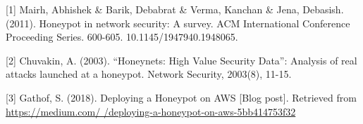 \documentclass{sig-alternate}
\begin{document}
%
%
%
[1] Mairh, Abhishek \& Barik, Debabrat \& Verma, Kanchan \& Jena, Debasish. (2011). Honeypot in network security: A survey. ACM International Conference Proceeding Series. 600-605. 10.1145/1947940.1948065. \linebreak

[2] Chuvakin, A. (2003). “Honeynets: High Value Security Data”: Analysis of real attacks launched at a honeypot. Network Security, 2003(8), 11-15. \linebreak

[3] Gathof, S. (2018). Deploying a Honeypot on AWS [Blog post]. Retrieved from \href{https://medium.com/@sudojune/deploying-a-honeypot-on-aws-5bb414753f32}{https://medium.com/
	\linebreak@sudojune/deploying-a-honeypot-on-aws-5bb414753f32}
\end{document}
